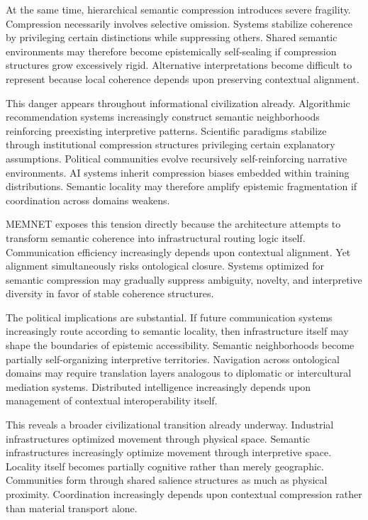 \documentclass[11pt,a4paper]{article}
\begin{document}
At the same time, hierarchical semantic compression introduces severe fragility. Compression necessarily involves selective omission. Systems stabilize coherence by privileging certain distinctions while suppressing others. Shared semantic environments may therefore become epistemically self-sealing if compression structures grow excessively rigid. Alternative interpretations become difficult to represent because local coherence depends upon preserving contextual alignment.

This danger appears throughout informational civilization already. Algorithmic recommendation systems increasingly construct semantic neighborhoods reinforcing preexisting interpretive patterns. Scientific paradigms stabilize through institutional compression structures privileging certain explanatory assumptions. Political communities evolve recursively self-reinforcing narrative environments. AI systems inherit compression biases embedded within training distributions. Semantic locality may therefore amplify epistemic fragmentation if coordination across domains weakens.

MEMNET exposes this tension directly because the architecture attempts to transform semantic coherence into infrastructural routing logic itself. Communication efficiency increasingly depends upon contextual alignment. Yet alignment simultaneously risks ontological closure. Systems optimized for semantic compression may gradually suppress ambiguity, novelty, and interpretive diversity in favor of stable coherence structures.

The political implications are substantial. If future communication systems increasingly route according to semantic locality, then infrastructure itself may shape the boundaries of epistemic accessibility. Semantic neighborhoods become partially self-organizing interpretive territories. Navigation across ontological domains may require translation layers analogous to diplomatic or intercultural mediation systems. Distributed intelligence increasingly depends upon management of contextual interoperability itself.

This reveals a broader civilizational transition already underway. Industrial infrastructures optimized movement through physical space. Semantic infrastructures increasingly optimize movement through interpretive space. Locality itself becomes partially cognitive rather than merely geographic. Communities form through shared salience structures as much as physical proximity. Coordination increasingly depends upon contextual compression rather than material transport alone.
\end{document}
